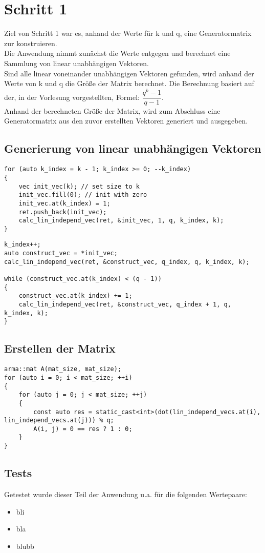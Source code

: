 \section{Schritt 1}
Ziel von Schritt 1 war es, anhand der Werte für k und q, eine Generatormatrix zur konstruieren. \\
Die Anwendung nimmt zunächst die Werte  entgegen und berechnet eine Sammlung von linear unabhängigen Vektoren.\\
Sind alle linear voneinander unabhängigen Vektoren gefunden, wird anhand der Werte von k und q die Größe der Matrix berechnet. Die Berechnung basiert auf der, in der Vorlesung vorgestellten, Formel: $\dfrac{q^{k}-1}{q-1}$. \\
Anhand der berechneten Größe der Matrix, wird zum Abschluss eine Generatormatrix aus den zuvor erstellten Vektoren generiert und ausgegeben.
\subsection{Generierung von linear unabhängigen Vektoren}
\begin{lstlisting}[caption=Generierung der Vektoren]
for (auto k_index = k - 1; k_index >= 0; --k_index)
{
	vec init_vec(k); // set size to k
	init_vec.fill(0); // init with zero
	init_vec.at(k_index) = 1;
	ret.push_back(init_vec);
	calc_lin_independ_vec(ret, &init_vec, 1, q, k_index, k);
}	
\end{lstlisting}
\begin{lstlisting}[caption=Berechnung der linearen Unabhängigkeiten]
k_index++;
auto construct_vec = *init_vec;
calc_lin_independ_vec(ret, &construct_vec, q_index, q, k_index, k);
	
while (construct_vec.at(k_index) < (q - 1))
{
	construct_vec.at(k_index) += 1;
	calc_lin_independ_vec(ret, &construct_vec, q_index + 1, q, k_index, k);
}
\end{lstlisting}

\subsection{Erstellen der Matrix}
\begin{lstlisting}[caption=Erstellen der Generatormatrix]
arma::mat A(mat_size, mat_size);
for (auto i = 0; i < mat_size; ++i)
{
	for (auto j = 0; j < mat_size; ++j)
	{
		const auto res = static_cast<int>(dot(lin_independ_vecs.at(i), lin_independ_vecs.at(j))) % q;
		A(i, j) = 0 == res ? 1 : 0;
	}
}
\end{lstlisting}
  
\subsection{Tests}
Getestet wurde dieser Teil der Anwendung u.a. für die folgenden Wertepaare:

\begin{itemize}
	\item bli
	\item bla
	\item blubb
	
\end{itemize}
